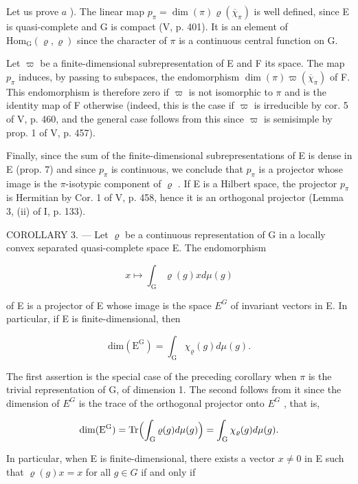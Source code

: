 Let us prove \(a\) ). The linear map \(p_{\pi} = \dim(\pi)\varrho(\overline{\chi}_{\pi})\) is well defined, since E is quasi-complete and G is compact (V, p. 401). It is an element of \(\mathrm{Hom}_{\mathrm{G}}(\varrho,\varrho)\) since the character of \(\pi\) is a continuous central function on G.

Let \(\varpi\) be a finite-dimensional subrepresentation of E and F its space. The map \(p_{\pi}\) induces, by passing to subspaces, the endomorphism \(\dim(\pi)\varpi(\overline{\chi}_{\pi})\) of F. This endomorphism is therefore zero if \(\varpi\) is not isomorphic to \(\pi\) and is the identity map of F otherwise (indeed, this is the case if \(\varpi\) is irreducible by cor. 5 of V, p. 460, and the general case follows from this since \(\varpi\) is semisimple by prop. 1 of V, p. 457).

Finally, since the sum of the finite-dimensional subrepresentations of E is dense in E (prop. 7) and since \(p_{\pi}\) is continuous, we conclude that \(p_{\pi}\) is a projector whose image is the \(\pi\)-isotypic component of \(\varrho\) . If E is a Hilbert space, the projector \(p_{\pi}\) is Hermitian by Cor. 1 of V, p. 458, hence it is an orthogonal projector (Lemma 3, (ii) of I, p. 133).

COROLLARY 3. --- Let \(\varrho\) be a continuous representation of G in a locally convex separated quasi-complete space E. The endomorphism

\[
x \mapsto \int_ {\mathrm{G}} \varrho (g) x d \mu (g)
\]

of E is a projector of E whose image is the space \(E^{G}\) of invariant vectors in E. In particular, if E is finite-dimensional, then

\[
\mathrm{dim} (\mathrm{E} ^ {\mathrm{G}}) = \int_ {\mathrm{G}} \chi_ {\varrho} (g) d \mu (g).
\]

The first assertion is the special case of the preceding corollary when \(\pi\) is the trivial representation of G, of dimension 1. The second follows from it since the dimension of \(E^{G}\) is the trace of the orthogonal projector onto \(E^{G}\) , that is,

\[
\mathrm{dim} (\mathrm{E} ^ {\mathrm{G}}) = \mathrm{Tr} \Bigl (\int_ {\mathrm{G}} \varrho (g) d \mu (g) \Bigr) = \int_ {\mathrm{G}} \chi_ {\varrho} (g) d \mu (g).
\]

In particular, when E is finite-dimensional, there exists a vector \(x \neq 0\) in E such that \(\varrho(g)x = x\) for all \(g \in G\) if and only if

